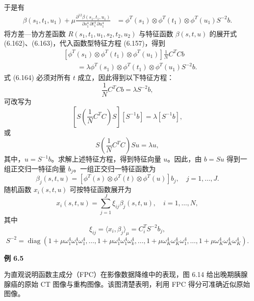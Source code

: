 于是有
\begin{equation}
\begin{aligned}
\beta(s_1,t_1,u_1)+\mu\frac{\partial^{12}\beta(s_1,t_1,u_1)}{\partial s_1^4\,\partial t_1^4\,\partial u_1^4}
&=\phi^T(s_1)\otimes\phi^T(t_1)\otimes\phi^T(u_1)S^{-2}b.
\end{aligned}\tag{6.163}
\end{equation}
将方差—协方差函数 $R(s_1,t_1,u_1,s_2,t_2,u_2)$ 与特征函数 $\beta(s,t,u)$ 的展开式 (6.162)、(6.163)，代入函数型特征方程 (6.157)，得到
\begin{equation}
\begin{aligned}
&[\phi^T(s_1)\otimes\phi^T(t_1)\otimes\phi^T(u_1)]\frac1N C^TCb\\
&\qquad=\lambda\phi^T(s_1)\otimes\phi^T(t_1)\otimes\phi^T(u_1)S^{-2}b.
\end{aligned}\tag{6.164}
\end{equation}
式 (6.164) 必须对所有 $t$ 成立，因此得到以下特征方程：
\begin{equation}
\frac1N C^TCb=\lambda S^{-2}b,
\tag{6.165}
\end{equation}
可改写为
\[
\left[S\left(\frac1N C^TC\right)S\right][S^{-1}b]=\lambda[S^{-1}b],
\]
或
\[
S\left(\frac1N C^TC\right)Su=\lambda u,
\]
其中，$u=S^{-1}b$。求解上述特征方程，得到特征向量 $u$。因此，由 $b=Su$ 得到一组正交归一特征向量 $b_j$。一组正交归一特征函数为
\begin{equation}
\beta_j(s,t,u)=[\phi^T(s)\otimes\phi^T(t)\otimes\phi^T(u)]b_j,\quad j=1,\ldots,J.
\tag{6.166}
\end{equation}
随机函数 $x_i(s,t,u)$ 可按特征函数展开为
\begin{equation}
x_i(s,t,u)=\sum_{j=1}^J\xi_{ij}\beta_j(s,t,u),\quad i=1,\ldots,N,
\tag{6.167}
\end{equation}
其中
\[
\xi_{ij}=\langle x_i,\beta_j\rangle_\mu=C_i^TS^{-2}b_j,
\]
\[
S^{-2}=\operatorname{diag}(1+\mu\omega_1^4\omega_1^4\omega_1^4,\ldots,1+\mu\omega_1^4\omega_1^4\omega_k^4,\ldots,1+\mu\omega_K^4\omega_K^4\omega_1^4,\ldots,1+\mu\omega_K^4\omega_K^4\omega_K^4).
\]

\noindent\textbf{例 6.5}

为直观说明函数主成分（FPC）在影像数据降维中的表现，图 6.14 给出晚期胰腺腺癌的原始 CT 图像与重构图像。该图清楚表明，利用 FPC 得分可准确近似原始图像。

